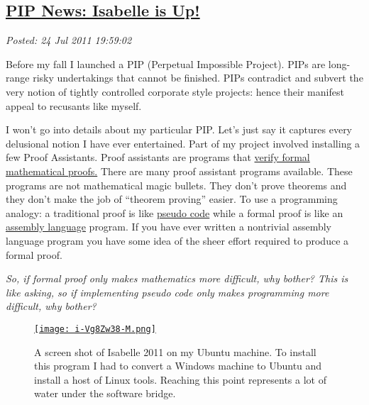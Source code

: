 %

\subsection*{\href{https://bakerjd99.wordpress.com/2011/07/24/pip-news-isabelle-is-up/}{PIP News: Isabelle is Up!}}


\noindent\emph{Posted: 24 Jul 2011 19:59:02}
\vspace{6pt}

Before my fall I launched a PIP (Perpetual Impossible Project). PIPs are
long-range risky undertakings that cannot be finished. PIPs
contradict and subvert the very notion of tightly controlled corporate
style projects: hence their manifest appeal to recusants like myself.

I won't go into details about my particular PIP. Let's just say it
captures every delusional notion I have ever entertained. Part of my
project involved installing a few Proof Assistants. Proof assistants are
programs that \href{http://www.cs.ru.nl/~freek/100/}{verify formal
mathematical proofs.} There are many proof assistant programs available.
These programs are not mathematical magic bullets. They don't prove
theorems and they don't make the job of ``theorem proving'' easier. To
use a programming analogy: a traditional proof is like
\href{http://en.wikipedia.org/wiki/Pseudocode}{pseudo code} while a
formal proof is like an
\href{http://en.wikipedia.org/wiki/Assembly\_language}{assembly
language} program. If you have ever written a nontrivial assembly
language program you have some idea of the sheer effort required to
produce a formal proof.

\emph{So, if formal proof only makes mathematics more difficult, why
bother? This is like asking, so if implementing pseudo code only makes
programming more difficult, why bother?}


\captionsetup[figure]{labelformat=empty}
\begin{SCfigure}[2][!h]
\centering
\href{http://www.cl.cam.ac.uk/research/hvg/Isabelle/index.html}{\texttt{[image: i-Vg8Zw38-M.png]}}
\caption{A  screen shot of Isabelle 2011 on my Ubuntu machine. To install this  
program I had to convert a Windows machine to Ubuntu and install a host  of Linux tools. 
Reaching this point represents a lot of water under the  software  bridge.}
\label{fig:1658X0}
\end{SCfigure}





%